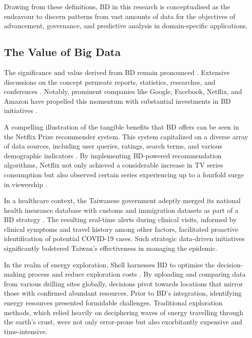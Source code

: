 \documentclass[preprint,12pt]{elsarticle}
\begin{document}
Drawing from these definitions, BD in this research is conceptualised as the endeavour to discern patterns from vast amounts of data for the objectives of advancement, governance, and predictive analysis in domain-specific applications.

\subsection{The Value of Big Data}\label{sec:The Value of Big Data}

The significance and value derived from BD remain pronounced \cite{ataei2022state}. Extensive discussions on the concept permeate reports, statistics, researches, and conferences \cite{Chen2012}. Notably, prominent companies like Google, Facebook, Netflix, and Amazon have propelled this momentum with substantial investments in BD initiatives \cite{Rada2017}.

A compelling illustration of the tangible benefits that BD offers can be seen in the Netflix Prize recommender system. This system capitalized on a diverse array of data sources, including user queries, ratings, search terms, and various demographic indicators \cite{Amatriain2013}. By implementing BD-powered recommendation algorithms, Netflix not only achieved a considerable increase in TV series consumption but also observed certain series experiencing up to a fourfold surge in viewership \cite{Amatriain2013}.


In a healthcare context, the Taiwanese government adeptly merged its national health insurance database with customs and immigration datasets as part of a BD strategy \cite{wang2020response}. The resulting real-time alerts during clinical visits, informed by clinical symptoms and travel history among other factors, facilitated proactive identification of potential COVID-19 cases. Such strategic data-driven initiatives significantly bolstered Taiwan's effectiveness in managing the epidemic.

In the realm of energy exploration, Shell harnesses BD to optimise the decision-making process and reduce exploration costs \cite{Marr2016}. By uploading and comparing data from various drilling sites globally, decisions pivot towards locations that mirror those with confirmed abundant resources. Prior to BD's integration, identifying energy resources presented formidable challenges. Traditional exploration methods, which relied heavily on deciphering waves of energy travelling through the earth's crust, were not only error-prone but also exorbitantly expensive and time-intensive.
\end{document}
